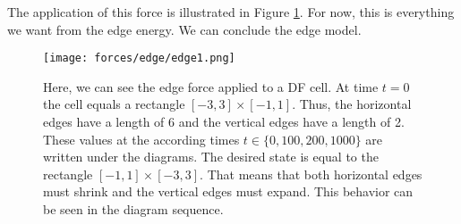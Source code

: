\documentclass[a4paper,12pt,leqno]{article}
\theoremstyle{plain}
\theoremstyle{remark}
\begin{document}
The application of this force is illustrated in Figure \ref{fig:edgeForce}. For now, this is everything we want from the edge energy. We can conclude the edge model. 

\begin{figure}[h!]
	\begin{center}
		\texttt{[image: forces/edge/edge1.png]}
		\caption{Here, we can see the edge force applied to a DF cell. At time $t=0$ the cell equals a rectangle $[-3, 3]\times[-1,1]$. Thus, the horizontal edges have a length of 6 and the vertical edges have a length of 2. These values at the according times $t \in \{ 0, 100, 200, 1000 \}$ are written under the diagrams. The desired state is equal to the rectangle $ [-1,1]\times[-3,3]$. That means that both horizontal edges must shrink and the vertical edges must expand. This behavior can be seen in the diagram sequence. }
		\label{fig:edgeForce}
	\end{center}
\end{figure}
\end{document}
